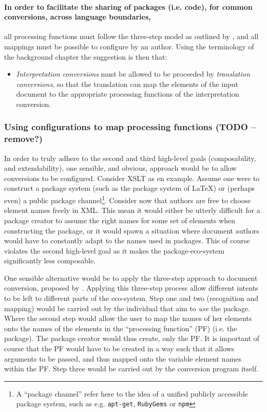 \documentclass{scrreprt}
\begin{document}
\paragraph{In order to facilitate the sharing of packages (i.e. code), for common conversions, across language boundaries, } all processing functions must follow the three-step model as outlined by \citet{goldfarb}, and all mappings must be possible to configure by an author. Using the terminology of the background chapter the suggestion is then that:

\begin{itemize}
\item \emph{Interpretation conversions} must be allowed to be proceeded by \emph{translation conversions}, so that the translation can map the elements of the input document to the appropriate processing functions of the interpretation conversion.
\end{itemize}




\color{red}
\subsubsection{Using configurations to map processing functions (TODO -- remove?)}
\label{sec:applying-three-step-model-to-quad-b}
In order to truly adhere to the second and third high-level goals (composability, and extendability), one sensible, and obvious, approach would be to allow conversions to be configured. Consider XSLT as en example. Assume one were to construct a package system (such as the package system of \LaTeX) or (perhaps even) a public package channel\footnote{A ``package channel'' refer here to the idea of a unified publicly accessible package system, such as e.g. \texttt{apt-get}, \texttt{RubyGems} or \texttt{npm}}. Consider now that authors are free to choose element names freely in XML. This mean it would either be utterly difficult for a package creator to assume the right names for some set of elements when constructing the package, or it would spawn a situation where document authors would have to constantly adapt to the names used in packages. This of course violates the second high-level goal as it makes the package-eco-system significantly less composable.

One sensible alternative would be to apply the three-step approach to document conversion, proposed by \citet{goldfarb}. Applying this three-step process allow different intents to be left to different parts of the eco-system. Step one and two (recognition and mapping) would be carried out by the individual that aim to \emph{use} the package. Where the second step would allow the user to map the names of her elements onto the names of the elements in the ``processing function'' (PF) (i.e. the package). The package creator would thus create, only the PF. It is important of course that the PF would have to be created in a way such that it allows arguments to be passed, and thus mapped onto the variable element names within the PF.  Step three would be carried out by the conversion program itself.
\end{document}
